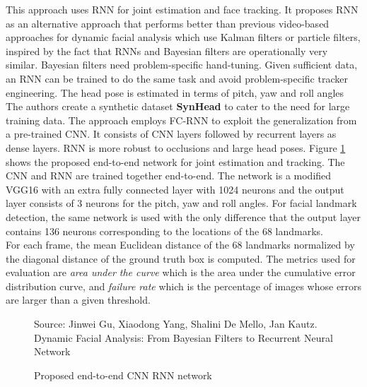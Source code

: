 \documentclass{llncs}
\begin{document}
This approach uses RNN for joint estimation and face tracking. 
It proposes RNN as an alternative approach that performs better than previous video-based approaches for dynamic facial analysis which use Kalman filters or particle filters, inspired by the fact that RNNs and Bayesian filters are operationally very similar.
Bayesian filters need problem-specific hand-tuning. Given sufficient data, an RNN can be trained to do the same task and avoid problem-specific tracker engineering. The head pose is estimated in terms of pitch, yaw and roll angles
The authors create a synthetic dataset \textbf{SynHead} to cater to the need for large training data. The approach employs FC-RNN to exploit the generalization from a pre-trained CNN. It consists of CNN layers followed by recurrent layers as dense layers. RNN is more robust to occlusions and large head poses. Figure \ref{cnn_rnn} shows the proposed end-to-end network for joint estimation and tracking. The CNN and RNN are trained together end-to-end. The network is a modified VGG16 with an extra fully connected layer with 1024 neurons and the output layer consists of 3 neurons for the pitch, yaw and roll angles. For facial landmark detection, the same network is used with the only difference that the output layer contains 136 neurons corresponding to the locations of the 68 landmarks.\\


For each frame, the mean Euclidean distance of the 68 landmarks normalized by the diagonal distance of the ground truth box is computed. The metrics used for evaluation are \textit{area under the curve} which is the area under the cumulative error distribution curve, and \textit{failure rate} which is the percentage of images whose errors are larger than a given threshold.

\begin{figure}
%
{Source: Jinwei Gu, Xiaodong Yang, Shalini De Mello, Jan Kautz. Dynamic Facial Analysis: From Bayesian Filters to Recurrent Neural Network}
\caption{Proposed end-to-end CNN RNN network}
\label{cnn_rnn}
\end{figure}
\end{document}
